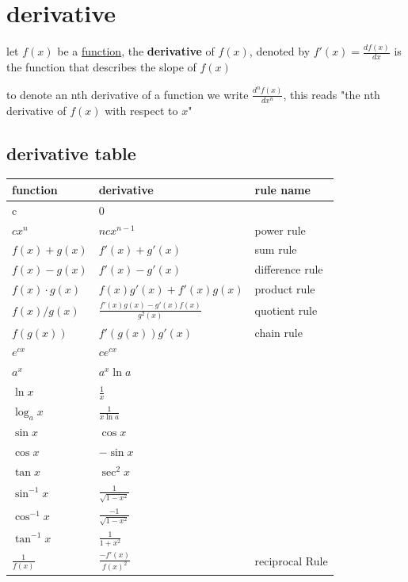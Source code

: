 \documentclass[a4paper,12pt]{article}
\newcommand{\?}{\stackrel{?}{=}}
\begin{document}
\section{derivative}
\label{sec:org5154d31}
\begin{definition}
let \(f(x)\) be a \href{discrete_maths2.org}{function}, the \textbf{derivative} of \(f(x)\), denoted by \(f'(x)=\frac{df(x)}{dx}\) is the function that describes the slope of \(f(x)\)\\[0pt]
\begin{note}
to denote an nth derivative of a function we write \(\frac{d^nf(x)}{dx^n}\), this reads "the nth derivative of \(f(x)\) with respect to \(x\)"\\[0pt]
\end{note}
\end{definition}
\subsection{derivative table}
\label{sec:orgcd100f2}
\begin{tabular}{lll}
function & derivative & rule name\\[0pt]
\hline
c & 0 & \\[0pt]
\(cx^n\) & \(ncx^{n-1}\) & power rule\\[0pt]
\(f(x)+g(x)\) & \(f'(x)+g'(x)\) & sum rule\\[0pt]
\(f(x)-g(x)\) & \(f'(x)-g'(x)\) & difference rule\\[0pt]
\(f(x)\cdot g(x)\) & \(f(x)g'(x)+f'(x)g(x)\) & product rule\\[0pt]
\(f(x)/g(x)\) & \(\frac{f'(x)g(x)-g'(x)f(x)}{g^2(x)}\) & quotient rule\\[0pt]
\(f(g(x))\) & \(f'(g(x))g'(x)\) & chain rule\\[0pt]
\(e^{cx}\) & \(ce^{cx}\) & \\[0pt]
\(a^x\) & \(a^x\ln a\) & \\[0pt]
\(\ln x\) & \(\frac{1}{x}\) & \\[0pt]
\(\log_a x\) & \(\frac{1}{x\ln{a}}\) & \\[0pt]
\(\sin x\) & \(\cos x\) & \\[0pt]
\(\cos x\) & \(-\sin x\) & \\[0pt]
\(\tan x\) & \(\sec^2 x\) & \\[0pt]
\(\sin^{-1} x\) & \(\frac{1}{\sqrt{1-x^2}}\) & \\[0pt]
\(\cos^{-1} x\) & \(\frac{-1}{\sqrt{1-x^2}}\) & \\[0pt]
\(\tan^{-1} x\) & \(\frac{1}{1+x^2}\) & \\[0pt]
\(\frac{1}{f(x)}\) & \(\frac{-f'(x)}{f(x)^2}\) & reciprocal Rule\\[0pt]
\end{tabular}
\end{document}
